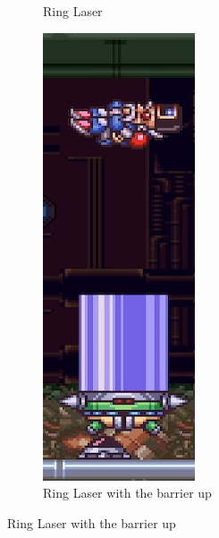 \begin{figure}[htp]
\begin{minipage}{.5\linewidth}
\begin{subfigure}{\linewidth}
			\caption{Ring Laser}
		\end{subfigure}
	\end{minipage}
	\begin{minipage}{0.255\linewidth}		
		\begin{subfigure}[t]{\linewidth}
			\centering
			\includegraphics[width=\linewidth]{figures/X2/Hunter_stages/Serges_barrier_jump.png}
			\caption{Ring Laser with the barrier up}
		\end{subfigure}
		

\end{minipage}
\end{figure}
